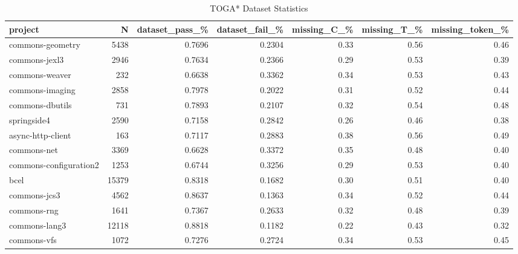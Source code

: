 \begin{table*}
\centering
\caption{TOGA* Dataset Statistics}
\label{tab:toga_stats_all}
\begin{tabular}{lrrrrrr}
\toprule
                project &       N &  dataset\_pass\_\% &  dataset\_fail\_\% &  missing\_C\_\% &  missing\_T\_\% &  missing\_token\_\% \\
\midrule
       commons-geometry &    5438 &          0.7696 &          0.2304 &         0.33 &         0.56 &             0.46 \\
          commons-jexl3 &    2946 &          0.7634 &          0.2366 &         0.29 &         0.53 &             0.39 \\
         commons-weaver &     232 &          0.6638 &          0.3362 &         0.34 &         0.53 &             0.43 \\
        commons-imaging &    2858 &          0.7978 &          0.2022 &         0.31 &         0.52 &             0.44 \\
        commons-dbutils &     731 &          0.7893 &          0.2107 &         0.32 &         0.54 &             0.48 \\
            springside4 &    2590 &          0.7158 &          0.2842 &         0.26 &         0.46 &             0.38 \\
      async-http-client &     163 &          0.7117 &          0.2883 &         0.38 &         0.56 &             0.49 \\
            commons-net &    3369 &          0.6628 &          0.3372 &         0.35 &         0.48 &             0.40 \\
 commons-configuration2 &    1253 &          0.6744 &          0.3256 &         0.29 &         0.53 &             0.40 \\
                   bcel &   15379 &          0.8318 &          0.1682 &         0.30 &         0.51 &             0.40 \\
           commons-jcs3 &    4562 &          0.8637 &          0.1363 &         0.34 &         0.52 &             0.44 \\
            commons-rng &    1641 &          0.7367 &          0.2633 &         0.32 &         0.48 &             0.39 \\
          commons-lang3 &   12118 &          0.8818 &          0.1182 &         0.22 &         0.43 &             0.32 \\
            commons-vfs &    1072 &          0.7276 &          0.2724 &         0.34 &         0.53 &             0.45 \\

\end{tabular}
\end{table*}
